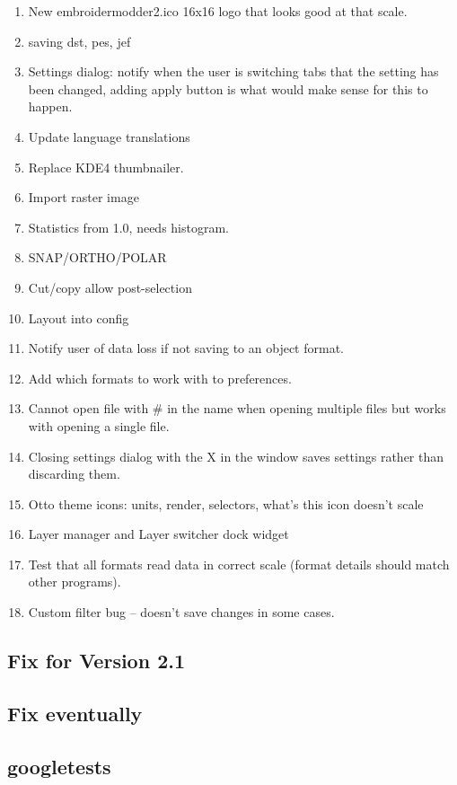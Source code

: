 \documentclass[a4paper]{report}
\begin{document}
\begin{enumerate}
\item New embroidermodder2.ico 16x16 logo that looks good at that scale.
\item saving dst, pes, jef
\item Settings dialog: notify when the user is switching tabs that the setting has been changed, adding apply button is what would make sense for this to happen.
\item Update language translations
\item Replace KDE4 thumbnailer.
\item Import raster image
\item Statistics from 1.0, needs histogram.
\item SNAP/ORTHO/POLAR
\item Cut/copy allow post-selection
\item Layout into config
\item Notify user of data loss if not saving to an object format.
\item Add which formats to work with to preferences.
\item Cannot open file with \# in the name when opening multiple files but works with opening a single file.
\item Closing settings dialog with the X in the window saves settings rather than discarding them.
\item Otto theme icons: units, render, selectors, what's this icon doesn't  scale
\item Layer manager and Layer switcher dock widget
\item Test that all formats read data in correct scale (format details should match other programs).
\item Custom filter bug -- doesn't save changes in some cases.
\end{enumerate}

\subsection{Fix for Version 2.1}

\subsection{Fix eventually}

\subsection{googletests}
\end{document}
